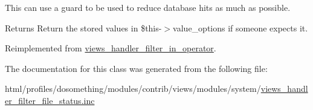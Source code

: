 This can use a guard to be used to reduce database hits as much as possible.

\begin{DoxyReturn}{Returns}
Return the stored values in \$this-\/$>$value\_\-options if someone expects it. 
\end{DoxyReturn}


Reimplemented from \hyperlink{classviews__handler__filter__in__operator_aa5b5df6d90f4359ed28c0c446bdc81a6}{views\_\-handler\_\-filter\_\-in\_\-operator}.

The documentation for this class was generated from the following file:\begin{DoxyCompactItemize}
\item 
html/profiles/dosomething/modules/contrib/views/modules/system/\hyperlink{views__handler__filter__file__status_8inc}{views\_\-handler\_\-filter\_\-file\_\-status.inc}\end{DoxyCompactItemize}
